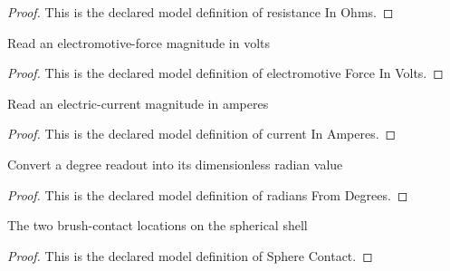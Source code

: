 \begin{proof}
  This is the declared model definition of resistance In Ohms.
\end{proof}
\begin{definition}
  \label{def:physics:phyx-mini-0982:phyxminiproblems-problemphyxmini0982-electromotiveforceinvolts}
  Read an electromotive-force magnitude in volts
\end{definition}
\begin{proof}
  This is the declared model definition of electromotive Force In Volts.
\end{proof}
\begin{definition}
  \label{def:physics:phyx-mini-0982:phyxminiproblems-problemphyxmini0982-currentinamperes}
  Read an electric-current magnitude in amperes
\end{definition}
\begin{proof}
  This is the declared model definition of current In Amperes.
\end{proof}
\begin{definition}
  \label{def:physics:phyx-mini-0982:phyxminiproblems-problemphyxmini0982-radiansfromdegrees}
  Convert a degree readout into its dimensionless radian value
\end{definition}
\begin{proof}
  This is the declared model definition of radians From Degrees.
\end{proof}
\begin{definition}
  \label{def:physics:phyx-mini-0982:phyxminiproblems-problemphyxmini0982-spherecontact}
  The two brush-contact locations on the spherical shell
\end{definition}
\begin{proof}
  This is the declared model definition of Sphere Contact.
\end{proof}
